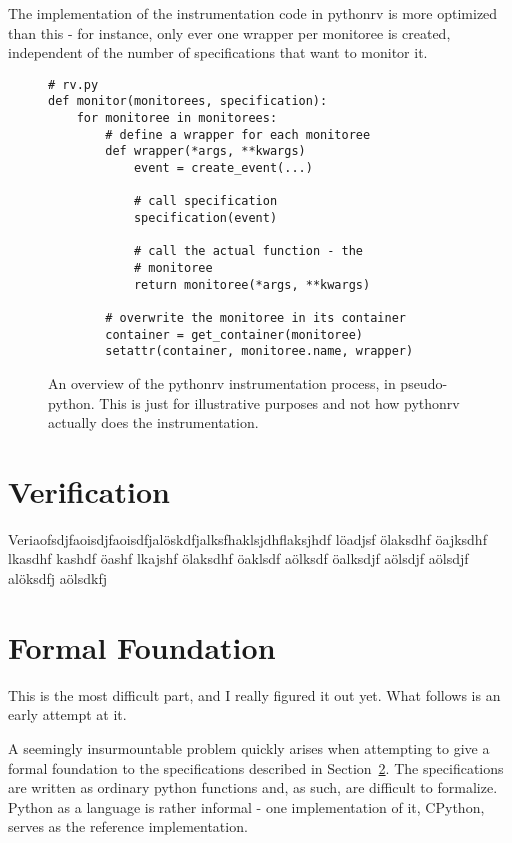 \documentclass[a4paper,11pt]{kth-mag}
\begin{document}
The implementation of the instrumentation code in pythonrv is more optimized
than this - for instance, only ever one wrapper per monitoree is created,
independent of the number of specifications that want to monitor it.

\begin{figure}[h!]

	\begin{center}
	\begin{minipage}{0.7\textwidth}
	\begin{lstlisting}
# rv.py
def monitor(monitorees, specification):
	for monitoree in monitorees:
		# define a wrapper for each monitoree
		def wrapper(*args, **kwargs)
			event = create_event(...)

			# call specification
			specification(event)

			# call the actual function - the
			# monitoree
			return monitoree(*args, **kwargs)

		# overwrite the monitoree in its container
		container = get_container(monitoree)
		setattr(container, monitoree.name, wrapper)
	\end{lstlisting}
	\end{minipage}
	\end{center}

	\caption{An overview of the pythonrv instrumentation process, in
	pseudo-python. This is just for illustrative purposes and not how pythonrv
actually does the instrumentation.}
	\label{figure-instrumentation-overview}
\end{figure}


\section{Verification}

Veriaofsdjfaoisdjfaoisdfjalöskdfjalksfhaklsjdhflaksjhdf löadjsf ölaksdhf
öajksdhf lkasdhf kashdf öashf lkajshf ölaksdhf öaklsdf aölksdf öalksdjf aölsdjf
aölsdjf alöksdfj aölsdkfj 


\section{Formal Foundation} \label{section-method-syntax}

This is the most difficult part, and I really figured it out yet. What follows
is an early attempt at it.

A seemingly insurmountable problem quickly arises when attempting to give a
formal foundation to the specifications described in
Section~\ref{section-method-syntax}. The specifications are written as ordinary
python functions and, as such, are difficult to formalize. Python as a language
is rather informal - one implementation of it, CPython, serves as the reference
implementation.
\end{document}
